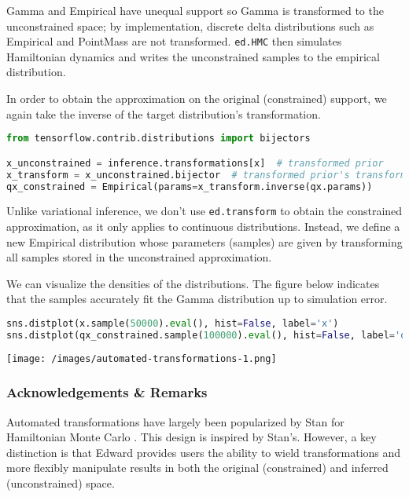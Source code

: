 Gamma and Empirical have unequal support so Gamma is transformed to
the unconstrained space; by implementation, discrete delta
distributions such as Empirical and PointMass are not transformed.
\texttt{ed.HMC} then simulates Hamiltonian
dynamics and writes the unconstrained samples to the empirical
distribution.

In order to obtain the approximation on the original (constrained)
support, we again take the inverse of the target distribution's
transformation.

\begin{lstlisting}[language=Python]
from tensorflow.contrib.distributions import bijectors

x_unconstrained = inference.transformations[x]  # transformed prior
x_transform = x_unconstrained.bijector  # transformed prior's transformation
qx_constrained = Empirical(params=x_transform.inverse(qx.params))
\end{lstlisting}

Unlike variational inference, we don't use \texttt{ed.transform} to
obtain the constrained approximation, as it only applies to continuous
distributions. Instead, we define a new Empirical distribution whose
parameters (samples) are given by transforming all samples stored in
the unconstrained approximation.

We can visualize the densities of the distributions.
The figure below indicates that the samples accurately fit the Gamma
distribution up to simulation error.

\begin{lstlisting}[language=Python]
sns.distplot(x.sample(50000).eval(), hist=False, label='x')
sns.distplot(qx_constrained.sample(100000).eval(), hist=False, label='qx')
\end{lstlisting}

\texttt{[image: /images/automated-transformations-1.png]}

\subsubsection{Acknowledgements \& Remarks}

Automated transformations have largely been popularized by Stan
for Hamiltonian Monte Carlo \citep{carpenter2016stan}.
This design is inspired by Stan's. However, a key distinction is that Edward
provides users the ability to wield transformations and more flexibly
manipulate results in both the original (constrained) and inferred
(unconstrained) space.

